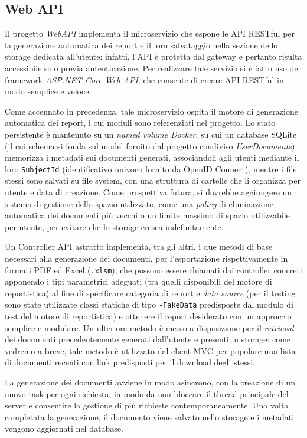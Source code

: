 \subsection{Web API}
Il progetto \emph{WebAPI} implementa il microservizio che espone le API RESTful per la generazione automatica dei report e il loro salvataggio nella sezione dello storage dedicata all'utente: infatti, l'API è protetta dal gateway e pertanto risulta accessibile solo previa autenticazione.
Per realizzare tale servizio si è fatto uso del framework \emph{ASP.NET Core Web API}, che consente di creare API RESTful in modo semplice e veloce.

Come accennato in precedenza, tale microservizio ospita il motore di generazione automatica dei report, i cui moduli sono referenziati nel progetto.
Lo stato persistente è mantenuto su un \emph{named volume Docker}, su cui un database SQLite (il cui schema si fonda sul model fornito dal progetto condiviso \emph{UserDocuments}) memorizza i metadati sui documenti generati, associandoli agli utenti mediante il loro \texttt{SubjectId} (identificativo univoco fornito da OpenID Connect), mentre i file stessi sono salvati su file system, con una struttura di cartelle che li organizza per utente e data di creazione. Come prospettiva futura, si dovrebbe aggiungere un sistema di gestione dello spazio utilizzato, come una \emph{policy} di eliminazione automatica dei documenti più vecchi o un limite massimo di spazio utilizzabile per utente, per evitare che lo storage cresca indefinitamente.

Un Controller API astratto implementa, tra gli altri, i due metodi di base necessari alla generazione dei documenti, per l'esportazione rispettivamente in formati PDF ed Excel (\texttt{.xlsm}), che possono essere chiamati dai controller concreti apponendo i tipi parametrici adeguati (tra quelli disponibili del motore di reportistica) al fine di specificare categoria di report e \emph{data source} (per il testing sono state utilizzate classi statiche di tipo \texttt{-FakeData} predisposte dal modulo di test del motore di reportistica) e ottenere il report desiderato con un approccio semplice e modulare. Un ulteriore metodo è messo a disposizione per il \emph{retrieval} dei documenti precedentemente generati dall'utente e presenti in storage: come vedremo a breve, tale metodo è utilizzato dal client MVC per popolare una lista di documenti recenti con link predisposti per il download degli stessi.

La generazione dei documenti avviene in modo asincrono, con la creazione di un nuovo task per ogni richiesta, in modo da non bloccare il thread principale del server e consentire la gestione di più richieste contemporaneamente. Una volta completata la generazione, il documento viene salvato nello storage e i metadati vengono aggiornati nel database.

